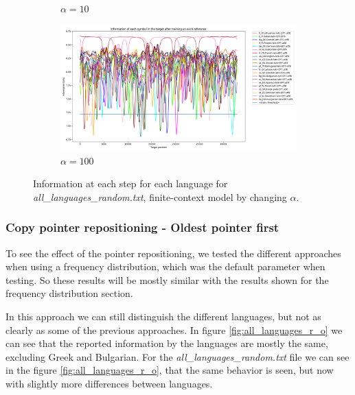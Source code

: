 \documentclass{article}
\begin{document}
\begin{figure}
\begin{subfigure}[b]{0.3\textwidth}
\begin{center}
        \end{center}
        \caption{$\alpha = 10$}
        \label{fig:all_languages_random_p_c:10:3}
    \end{subfigure}
    \hfill
    \begin{subfigure}[b]{0.3\textwidth}
        \begin{center}
            \includegraphics[width=1.0\linewidth]{../results/all_languages_random/-p_c:100:3.png}
        \end{center}
        \caption{$\alpha = 100$}
        \label{fig:all_languages_random_p_c:100:3}
    \end{subfigure}
    
    \caption{Information at each step for each language for \textit{all\_languages\_random.txt}, finite-context model by changing $\alpha$.}
    \label{fig:all_languages_random_p_c:alpha}
\end{figure}

\subsubsection{Copy pointer repositioning - Oldest pointer first}
\label{subsubsec:results_locate_lang_oldest_pointer_first}

To see the effect of the pointer repositioning, we tested the different approaches when using a frequency distribution, which was the default parameter when testing.
So these results will be mostly similar with the results shown for the frequency distribution section.

In this approach we can still distinguish the different languages, but not as clearly as some of the previous approaches.
In figure \ref{fig:all_languages_r_o} we can see that the reported information by the languages are mostly the same, excluding Greek and Bulgarian.
For the \textit{all\_languages\_random.txt} file we can see in the figure \ref{fig:all_languages_r_o}, that the same behavior is seen, but now with slightly more differences between languages.
\end{document}
